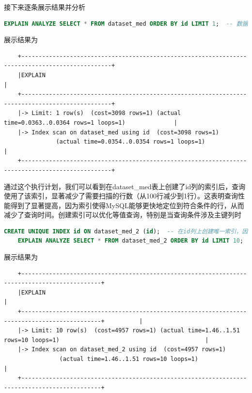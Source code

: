 \documentclass{article}
\begin{document}
	接下来逐条展示结果并分析
	
	\begin{lstlisting}[language=sql, title=数据集规模100，查询单条结果, tabsize=4]
	EXPLAIN ANALYZE SELECT * FROM dataset_med ORDER BY id LIMIT 1;  -- 数据集规模100，查询单条结果
	\end{lstlisting}
	
	展示结果为
	
	\begin{verbatim}
	+------------------------------------------------------------------------------------------------+
	|EXPLAIN                                                                                         |
	+------------------------------------------------------------------------------------------------+
	|-> Limit: 1 row(s)  (cost=3098 rows=1) (actual time=0.0363..0.0364 rows=1 loops=1)              |
	|-> Index scan on dataset_med using id  (cost=3098 rows=1)
	           (actual time=0.0354..0.0354 rows=1 loops=1)                                           |
	+------------------------------------------------------------------------------------------------+
	\end{verbatim}
	
	通过这个执行计划，我们可以看到在dataset\_med表上创建了id列的索引后，查询使用了该索引，显著减少了需要扫描的行数（从100行减少到1行）。这表明查询性能得到了显著提高，因为索引使得MySQL能够更快地定位到符合条件的行，从而减少了查询时间。创建索引可以优化等值查询，特别是当查询条件涉及主键列时
	
	\begin{lstlisting}[language=sql, title=数据集规模10000，查询少量结果, tabsize=4]
	CREATE UNIQUE INDEX id ON dataset_med_2 (id);  -- 在id列上创建唯一索引，因为id列中的每个值都是唯一的。
	EXPLAIN ANALYZE SELECT * FROM dataset_med_2 ORDER BY id LIMIT 10;  -- 数据集规模10,000，查询少量结果
	\end{lstlisting}
	
	展示结果为
	
	\begin{verbatim}
	+---------------------------------------------------------------------------------------------+
	|EXPLAIN                                                                                      |
	+---------------------------------------------------------------------------------------------+          |
	|-> Limit: 10 row(s)  (cost=4957 rows=1) (actual time=1.46..1.51 rows=10 loops=1)                                          |
	|-> Index scan on dataset_med_2 using id  (cost=4957 rows=1)
	            (actual time=1.46..1.51 rows=10 loops=1)                                          |
	+---------------------------------------------------------------------------------------------+
	\end{verbatim}
	
\end{document}
